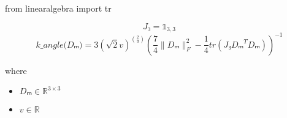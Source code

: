 \documentclass[12pt]{article}
\begin{document}
from linearalgebra import tr

\[
\textit{J₃} = \mathbb{ 1 }_{ 3,3 }
\]
\[
\textit{k\_angle(Dₘ)} = 3( \sqrt{2}\textit{v})^{(\frac{2}{3})}(\frac{7}{4}\|\textit{Dₘ}\|_F^{2} - \frac{1}{4}tr(\textit{J₃}\textit{Dₘ}^T\textit{Dₘ}))^{-1}
\]

where
\begin{itemize}
\item $\textit{Dₘ} \in \mathbb{R}^{ 3 \times 3 }$
\item $\textit{v} \in \mathbb{{R}}$
\end{itemize}
\end{document}
